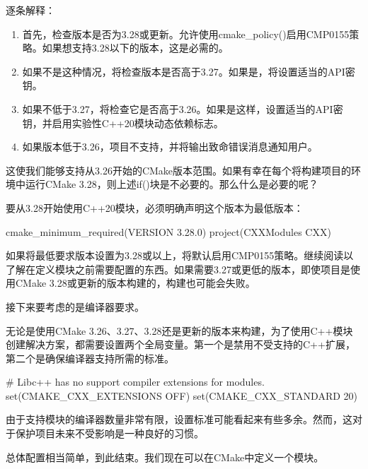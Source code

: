 逐条解释：

\begin{enumerate}
\item
首先，检查版本是否为3.28或更新。允许使用cmake\_policy()启用CMP0155策略。如果想支持3.28以下的版本，这是必需的。

\item
如果不是这种情况，将检查版本是否高于3.27。如果是，将设置适当的API密钥。

\item
如果不低于3.27，将检查它是否高于3.26。如果是这样，设置适当的API密钥，并启用实验性C++20模块动态依赖标志。

\item
如果版本低于3.26，项目不支持，并将输出致命错误消息通知用户。
\end{enumerate}

这使我们能够支持从3.26开始的CMake版本范围。如果有幸在每个将构建项目的环境中运行CMake 3.28，则上述if()块是不必要的。那么什么是必要的呢？


要从3.28开始使用C++20模块，必须明确声明这个版本为最低版本：

\begin{cmake}
cmake_minimum_required(VERSION 3.28.0)
project(CXXModules CXX)
\end{cmake}

如果将最低要求版本设置为3.28或以上，将默认启用CMP0155策略。继续阅读以了解在定义模块之前需要配置的东西。如果需要3.27或更低的版本，即使项目是使用CMake 3.28或更新的版本构建的，构建也可能会失败。

接下来要考虑的是编译器要求。


无论是使用CMake 3.26、3.27、3.28还是更新的版本来构建，为了使用C++模块创建解决方案，都需要设置两个全局变量。第一个是禁用不受支持的C++扩展，第二个是确保编译器支持所需的标准。


\begin{cmake}
# Libc++ has no support compiler extensions for modules.
set(CMAKE_CXX_EXTENSIONS OFF)
set(CMAKE_CXX_STANDARD 20)
\end{cmake}

由于支持模块的编译器数量非常有限，设置标准可能看起来有些多余。然而，这对于保护项目未来不受影响是一种良好的习惯。

总体配置相当简单，到此结束。我们现在可以在CMake中定义一个模块。


